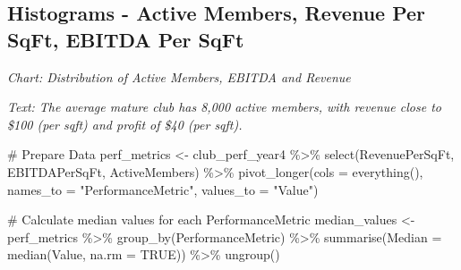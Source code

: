 \documentclass[
  letterpaper,
  oneside,
  11pt]{article}
\newenvironment{Shaded}{\begin{snugshade}}{\end{snugshade}}
\newcommand{\AttributeTok}[1]{\textcolor[rgb]{0.40,0.45,0.13}{#1}}
\newcommand{\CommentTok}[1]{\textcolor[rgb]{0.37,0.37,0.37}{#1}}
\newcommand{\ConstantTok}[1]{\textcolor[rgb]{0.56,0.35,0.01}{#1}}
\newcommand{\FunctionTok}[1]{\textcolor[rgb]{0.28,0.35,0.67}{#1}}
\newcommand{\NormalTok}[1]{\textcolor[rgb]{0.00,0.23,0.31}{#1}}
\newcommand{\OtherTok}[1]{\textcolor[rgb]{0.00,0.23,0.31}{#1}}
\newcommand{\SpecialCharTok}[1]{\textcolor[rgb]{0.37,0.37,0.37}{#1}}
\newcommand{\StringTok}[1]{\textcolor[rgb]{0.13,0.47,0.30}{#1}}
\begin{document}
\subsection{Histograms - Active Members, Revenue Per SqFt, EBITDA Per
SqFt}\label{histograms---active-members-revenue-per-sqft-ebitda-per-sqft}

\emph{Chart: Distribution of Active Members, EBITDA and Revenue}

\emph{Text: The average mature club has 8,000 active members, with
revenue close to \$100 (per sqft) and profit of \$40 (per sqft).}

\begin{Shaded}
\begin{Highlighting}[]
\CommentTok{\# Prepare Data}
\NormalTok{perf\_metrics }\OtherTok{\textless{}{-}}\NormalTok{ club\_perf\_year4 }\SpecialCharTok{\%\textgreater{}\%}
  \FunctionTok{select}\NormalTok{(RevenuePerSqFt, EBITDAPerSqFt, ActiveMembers) }\SpecialCharTok{\%\textgreater{}\%}
  \FunctionTok{pivot\_longer}\NormalTok{(}\AttributeTok{cols =} \FunctionTok{everything}\NormalTok{(), }\AttributeTok{names\_to =} \StringTok{"PerformanceMetric"}\NormalTok{, }\AttributeTok{values\_to =} \StringTok{"Value"}\NormalTok{)}

\CommentTok{\# Calculate median values for each PerformanceMetric}
\NormalTok{median\_values }\OtherTok{\textless{}{-}}\NormalTok{ perf\_metrics }\SpecialCharTok{\%\textgreater{}\%}
  \FunctionTok{group\_by}\NormalTok{(PerformanceMetric) }\SpecialCharTok{\%\textgreater{}\%}
  \FunctionTok{summarise}\NormalTok{(}\AttributeTok{Median =} \FunctionTok{median}\NormalTok{(Value, }\AttributeTok{na.rm =} \ConstantTok{TRUE}\NormalTok{)) }\SpecialCharTok{\%\textgreater{}\%}
  \FunctionTok{ungroup}\NormalTok{()}


\end{Highlighting}
\end{Shaded}
\end{document}

